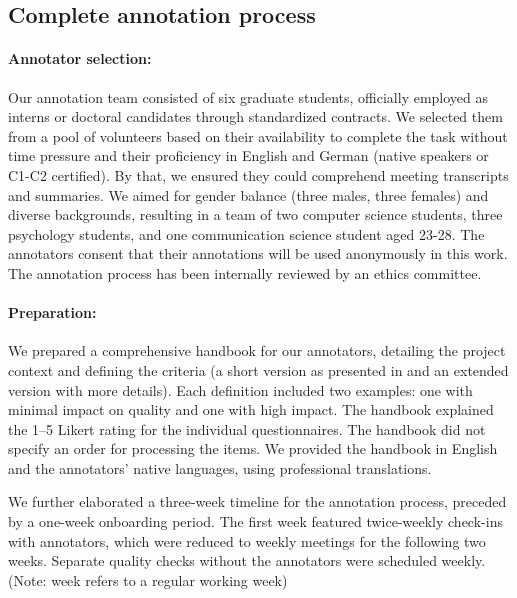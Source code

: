 \subsection{Complete annotation process}
\paragraph{Annotator selection:}
Our annotation team consisted of six graduate students, officially employed as interns or doctoral candidates through standardized contracts.
We selected them from a pool of volunteers based on their availability to complete the task without time pressure and their proficiency in English and German (native speakers or C1-C2 certified).
By that, we ensured they could comprehend meeting transcripts and summaries.
We aimed for gender balance (three males, three females) and diverse backgrounds, resulting in a team of two computer science students, three psychology students, and one communication science student aged 23-28.
The annotators consent that their annotations will be used anonymously in this work.
The annotation process has been internally reviewed by an ethics committee.

\paragraph{Preparation:}
We prepared a comprehensive handbook for our annotators, detailing the project context and defining the criteria (a short version as presented in  and an extended version with more details).
Each definition included two examples: one with minimal impact on quality and one with high impact.
The handbook explained the 1--5 Likert rating for the individual questionnaires.
The handbook did not specify an order for processing the items.
We provided the handbook in English and the annotators' native languages, using professional translations.

We further elaborated a three-week timeline for the annotation process, preceded by a one-week onboarding period.
The first week featured twice-weekly check-ins with annotators, which were reduced to weekly meetings for the following two weeks. Separate quality checks without the annotators were scheduled weekly.
(Note: week refers to a regular working week)

